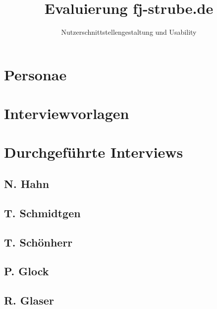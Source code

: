 \documentclass{scrreprt}
\title{Evaluierung fj-strube.de}
\subtitle{Nutzerschnittstellen\-gestaltung und Usability}
\author{Jan Brose\texorpdfstring{\strut\\}{, }
Simon Retsch\texorpdfstring{\strut\\}{, }
Eric Schmidtgen\texorpdfstring{\strut\\}{, }
Ben Schönherr\texorpdfstring{\strut\\}{, }
Falk-Jonatan Strube}
\begin{document}
\maketitle
\tableofcontents

\chapter{Personae}


\chapter{Interviewvorlagen}

\clearpage



\chapter{Durchgeführte Interviews}
\renewcommand{\interviewText}[1]{%
\begin{center}
	\fbox{%
		\begin{minipage}{.95\linewidth}%
			#1
		\end{minipage}%
	}%
\end{center}
}
\section{N. Hahn}


\clearpage
\section{T. Schmidtgen}


\clearpage
\section{T. Schönherr}


\clearpage
\section{P. Glock}


\clearpage
\section{R. Glaser}


\clearpage
\end{document}
